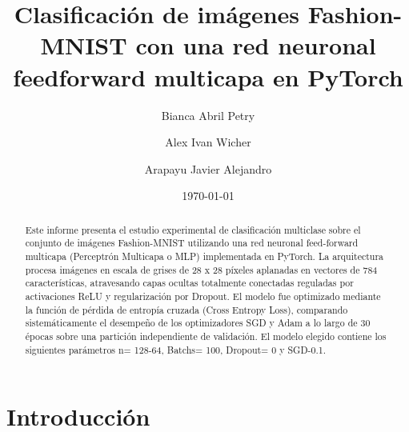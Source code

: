 \documentclass[aps,prl,twocolumn,superscriptaddress]{revtex4-2}
\begin{document}
\title{
Clasificación de imágenes Fashion-MNIST con una red neuronal feedforward multicapa en PyTorch
}

\author{Bianca Abril Petry}

\author{Alex Ivan Wicher}

\author{Arapayu Javier Alejandro}


\date{\today}

\begin{abstract}
Este informe presenta el estudio experimental de clasificación multiclase sobre el conjunto de imágenes Fashion-MNIST utilizando una red neuronal feed-forward multicapa (Perceptrón Multicapa o MLP) implementada en PyTorch. La arquitectura procesa imágenes en escala de grises de 28 x 28 píxeles aplanadas en vectores de 784 características, atravesando capas ocultas totalmente conectadas reguladas por activaciones ReLU y regularización por Dropout. El modelo fue optimizado mediante la función de pérdida de entropía cruzada (Cross Entropy Loss), comparando sistemáticamente el desempeño de los optimizadores SGD y Adam a lo largo de 30 épocas sobre una partición independiente de validación. El modelo elegido contiene los siguientes parámetros n= 128-64, Batchs= 100, Dropout= 0 y SGD-0.1. 


\end{abstract}

\maketitle

\section{Introducción}
\end{document}
